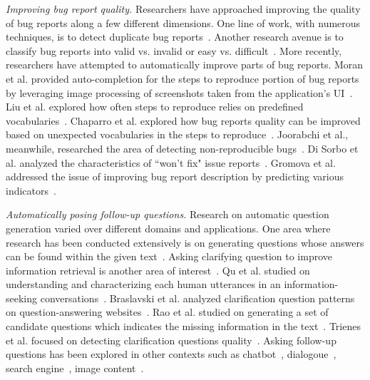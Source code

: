 \noindent
{\em Improving bug report quality.} Researchers have approached improving the quality of bug reports along a few different dimensions. One line of work, with numerous techniques, is to detect duplicate bug reports~\cite{chaparro19reformulating}. Another research avenue is to classify bug reports into valid vs. invalid or easy vs. difficult~\cite{fan20chaff,hooimeijer07modeling}. More recently, researchers have attempted to automatically improve parts of bug reports. Moran et al. provided auto-completion for the steps to reproduce portion of bug reports by leveraging image processing of screenshots taken from the application's UI~\cite{moran15autocompleting}. Liu et al. explored how often steps to reproduce relies on predefined vocabularies~\cite{liu2020automated}. Chaparro et al. explored how bug reports quality can be improved based on unexpected vocabularies in the steps to reproduce~\cite{Chaparro2019AssessingTQ}. Joorabchi et al., meanwhile, researched the area of detecting non-reproducible bugs~\cite{erfani2014works}. Di Sorbo et al. analyzed the characteristics of ``won't fix" issue reports~\cite{Sorbo2019WontWF}. Gromova et al. addressed the issue of improving bug report description by predicting various indicators~\cite{gromova2019raising}.

\noindent
{\em Automatically posing follow-up questions.} Research on automatic question generation varied over different domains and applications. One area where research has been conducted extensively is on generating questions whose answers can be found within the given text~\cite{vanderwende2008importance, rus2011question, zhou2017neural, heilman2010good, duan2017question,  du2017learning}. Asking clarifying question to improve information retrieval is another area of interest~\cite{10.1145/3366423.3380126, 10.1145/3331184.3331265, stoyanchev2014towards}.  Qu et al. studied on understanding and characterizing each human utterances in an information-seeking conversations~\cite{10.1145/3209978.3210124}. Braslavski et al. analyzed clarification question patterns on question-answering websites~\cite{10.1145/3020165.3022149}. Rao et al. studied on generating a set of candidate questions which indicates the missing information in the text~\cite{rao-daume-iii-2018-learning}. Trienes et al. focused on detecting clarification questions quality~\cite{trienes2019identifying}. Asking follow-up questions has been explored in other contexts such as chatbot~\cite{Hancock2019LearningFD}, dialogoue~\cite{de2005implementing, de2003analysis}, search engine~\cite{Ren2020ConversationsWS}, image content~\cite{Mostafazadeh_2016}.
